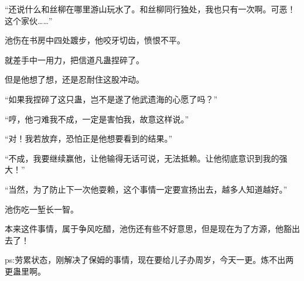 \begin{this_body}
“还说什么和丝柳在哪里游山玩水了。和丝柳同行独处，我也只有一次啊。可恶！这个家伙……”

池伤在书房中四处踱步，他咬牙切齿，愤恨不平。

就差手中一用力，把信道凡蛊捏碎了。

但是他想了想，还是忍耐住这股冲动。

“如果我捏碎了这只蛊，岂不是遂了他武遗海的心愿了吗？”

“哼，他刁难我不成，一定是害怕我，故意这样说。”

“对！我若放弃，恐怕正是他想要看到的结果。”

“不成，我要继续赢他，让他输得无话可说，无法抵赖。让他彻底意识到我的强大！”

“当然，为了防止下一次他耍赖，这个事情一定要宣扬出去，越多人知道越好。”

池伤吃一堑长一智。

本来这件事情，属于争风吃醋，池伤还有些不好意思，但是现在为了方源，他豁出去了！

ps:劳累状态，刚解决了保姆的事情，现在要给儿子办周岁，今天一更。炼不出两更蛊里啊。

\end{this_body}

